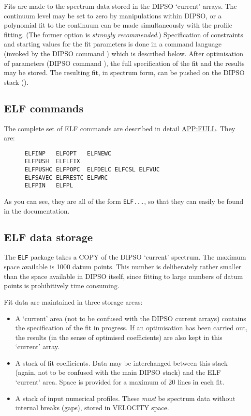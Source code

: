 Fits are made to the spectrum data stored in the DIPSO `current'
arrays. The continuum level may be set to zero by manipulations within
DIPSO, or a polynomial fit to the continuum can be made simultaneously
with the profile fitting. (The former option is {\em strongly
recommended}.) Specification of constraints and starting values for
the fit parameters is done in a command language (invoked by the DIPSO
command )  which is described below. After optimisation of
parameters (DIPSO command ),  the full specification of the
fit and the results may be stored. The resulting fit, in spectrum
form, can be pushed on the DIPSO stack (). 

\subsection {ELF commands}

The complete set of ELF commands are described in detail
\hyperref{below}{in appendix}{}{APP:FULL}. They are:

\begin{verbatim}
      ELFINP   ELFOPT   ELFNEWC
      ELFPUSH  ELFLFIX
      ELFPUSHC ELFPOPC  ELFDELC ELFCSL ELFVUC
      ELFSAVEC ELFRESTC ELFWRC
      ELFPIN   ELFPL
\end{verbatim}

As you can see, they are all of the form {\tt{ELF...}},  so that they can
easily be found in the documentation.

\subsection {ELF data storage}

The {\tt{ELF}}  package takes a COPY of the DIPSO `current' spectrum.
The maximum space available is 1000 datum points.
This number is deliberately rather smaller than the space available in DIPSO
itself, since fitting to large numbers of datum points is prohibitively time
consuming.

Fit data are maintained in three storage areas:

\begin{itemize}

\item A `current' area (not to be confused with the DIPSO current
arrays) contains the specification of the fit in progress. If an
optimisation has been carried out, the results (in the sense of
optimised coefficients) are also kept in this `current' array.

\item A stack of fit coefficients. Data may be interchanged between
this stack (again, not to be confused with the main DIPSO stack) and
the ELF `current' area. Space is provided for a maximum of 20 lines in
each fit.

\item A stack of input numerical profiles. These {\em must} be
spectrum data without internal breaks (gaps), stored in VELOCITY
space.

\end{itemize}

